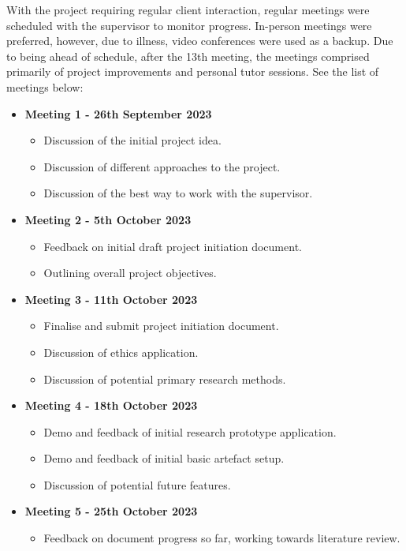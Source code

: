 With the project requiring regular client interaction, regular meetings were scheduled with the supervisor to monitor progress. In-person meetings were preferred, however, due to illness, video conferences were used as a backup. Due to being ahead of schedule, after the 13th meeting, the meetings comprised primarily of project improvements and personal tutor sessions. See the list of meetings below:

\begin{itemize}
    \item \textbf{Meeting 1 - 26th September 2023}
    \begin{itemize}
        \item Discussion of the initial project idea.
        \item Discussion of different approaches to the project.
        \item Discussion of the best way to work with the supervisor.
    \end{itemize}
    \item \textbf{Meeting 2 - 5th October 2023}
    \begin{itemize}
        \item Feedback on initial draft project initiation document.
        \item Outlining overall project objectives.
    \end{itemize}
    \item \textbf{Meeting 3 - 11th October 2023}
    \begin{itemize}
        \item Finalise and submit project initiation document.
        \item Discussion of ethics application.
        \item Discussion of potential primary research methods.
    \end{itemize}
    \item \textbf{Meeting 4 - 18th October 2023}
    \begin{itemize}
        \item Demo and feedback of initial research prototype application.
        \item Demo and feedback of initial basic artefact setup.
        \item Discussion of potential future features.
    \end{itemize}
    \item \textbf{Meeting 5 - 25th October 2023}
    \begin{itemize}
        \item Feedback on document progress so far, working towards literature review.

\end{itemize}
\end{itemize}

